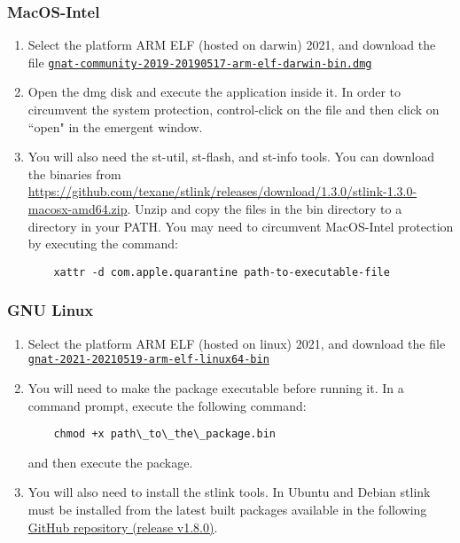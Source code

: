 \subsubsection*{MacOS-Intel}
\begin{enumerate}
\item Select the platform ARM ELF (hosted on darwin) 2021, and download the file \href{https://community.download.adacore.com/v1/1021f7395042c94e23b1b994c1d67b9d540bcd0b?filename=gnat-community-2019-20190517-arm-elf-darwin-bin.dmg&rand=576}{\nolinkurl{gnat-community-2019-20190517-arm-elf-darwin-bin.dmg}}
\item Open the dmg disk and execute the application inside it. In order to circumvent the system protection, control-click on the file and then click on ``open" in the emergent window.
\item You will also need the st-util,  st-flash, and st-info tools. You can download the binaries from 
\url{https://github.com/texane/stlink/releases/download/1.3.0/stlink-1.3.0-macosx-amd64.zip}. Unzip and copy the files in the bin directory to a directory in your PATH. You may need to circumvent MacOS-Intel protection by executing the command:
\begin{BVerbatim}
	xattr -d com.apple.quarantine path-to-executable-file
\end{BVerbatim}
\end{enumerate}
\subsubsection*{GNU Linux}
\begin{enumerate}
\item Select the platform ARM ELF (hosted on linux) 2021, and download the file \href{https://community.download.adacore.com/v1/2ceb9d1ada2029d79556b710c6c4834cade3749f?filename=gnat-2021-20210519-arm-elf-linux64-bin&rand=1031}{\nolinkurl{gnat-2021-20210519-arm-elf-linux64-bin}}
\item You will need to make the package executable before running it. In a command prompt, execute the following command:

\begin{BVerbatim}
	chmod +x path\_to\_the\_package.bin
\end{BVerbatim}

and then execute the package.
\item You will also need to install the stlink tools. In Ubuntu and Debian stlink must be installed from the latest built packages available in the following \href{https://github.com/stlink-org/stlink/releases/latest}{GitHub repository (release v1.8.0)}.
\end{enumerate}

